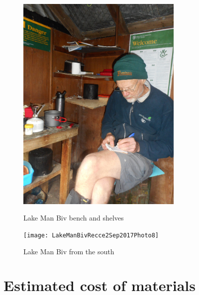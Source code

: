 \documentclass[12pt]{article} %
\begin{document}
\begin{figure}[ht]
\begin{minipage}{.5\linewidth}
\begin{flushleft}
   \includegraphics[width=8cm]{LakeManBivRecce2Sep2017Photo7}
   \caption{Lake Man Biv bench and shelves}
   \label{LMB4}
\end{flushleft}
\end{minipage}
\begin{minipage}{.5\linewidth}
\begin{center}
   \texttt{[image: LakeManBivRecce2Sep2017Photo8]}
   \caption{Lake Man Biv from the south}
   \label{LMB5}
\end{center}
\end{minipage}
\end{figure}

\section{Estimated cost of materials}
\end{document}
